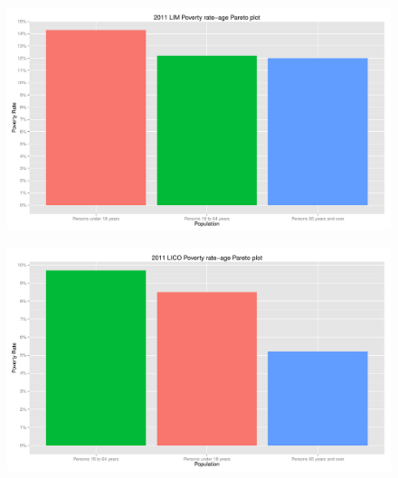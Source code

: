 \documentclass{article}\usepackage[]{graphicx}\usepackage[]{color}
\makeatletter
\def\maxwidth{ %
  \ifdim\Gin@nat@width>\linewidth
    \linewidth
  \else
    \Gin@nat@width
  \fi
}
\newenvironment{knitrout}{}{} %
\makeatother
\begin{document}
\begin{figure}[ht]
\begin{center}
\begin{knitrout}
\color{fgcolor}
\includegraphics[width=\maxwidth]{figure/unnamed-chunk-20} 

\end{knitrout}

\end{center}
\end{figure}
\begin{figure}[ht]
\begin{center}
\begin{knitrout}
\color{fgcolor}
\includegraphics[width=\maxwidth]{figure/unnamed-chunk-21} 

\end{knitrout}

\end{center}
\end{figure}
\end{document}
